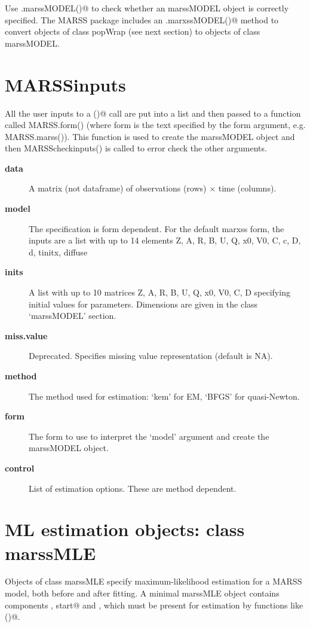 Use \verb@is.marssMODEL()@ to check whether an marssMODEL object is correctly specified. The MARSS package includes an \verb@as.marxssMODEL()@ method to convert objects of class popWrap (see next section) to objects of class marssMODEL. 

\section*{MARSSinputs}

All the user inputs to a \verb@MARSS()@ call are put into a list and then passed to a function called MARSS.form() (where form is the text specified by the form argument, e.g. MARSS.marss()).  This function is used to create the marssMODEL object and then MARSScheckinputs() is called to error check the other arguments.

  \begin{description}
  
  \item[\textbf{data}]{ A matrix (not dataframe) of observations (rows) $\times$ time (columns).  }
  \item[\textbf{model}]{ The specification is form dependent.  For the default marxss form, the inputs are a list with up to 14  elements Z, A, R, B, U, Q, x0, V0, C, c, D, d, tinitx, diffuse }
  \item[\textbf{inits}]{ A list with up to 10 matrices Z, A, R, B, U, Q, x0, V0, C, D specifying initial values for parameters. Dimensions are given in the class `marssMODEL' section. }
  \item[\textbf{miss.value}]{ Deprecated. Specifies missing value representation (default is NA). }
  \item[\textbf{method}]{ The method used for estimation: `kem' for EM, `BFGS' for quasi-Newton.}
  \item[\textbf{form}]{ The form to use to interpret the `model' argument and create the marssMODEL object.}
  \item[\textbf{control}]{ List of estimation options. These are method dependent. }  
  \end{description}


\section*{ML estimation objects: class marssMLE}

Objects of class marssMLE specify maximum-likelihood estimation for a MARSS model, both before and after fitting. A minimal marssMLE object contains components \verb@model, start@ and \verb@control@, which must be present for estimation by functions like \verb@MARSSkem()@.

